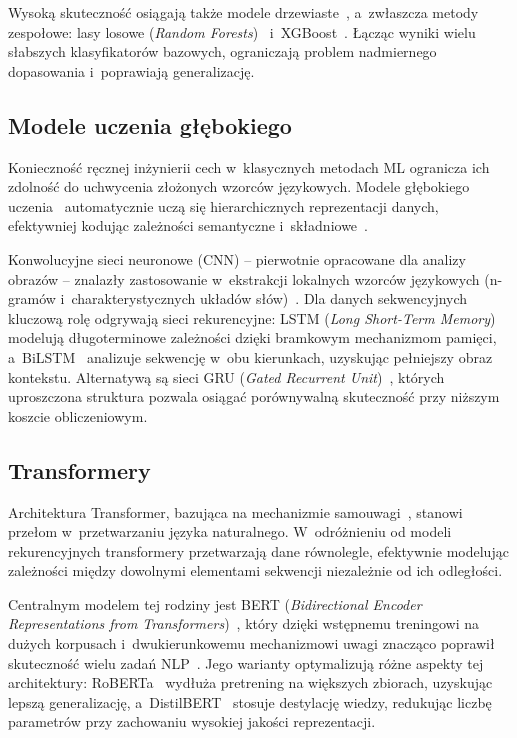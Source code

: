 \documentclass[oneside,polski,logo]{amuthesis}
\begin{document}
Wysoką skuteczność osiągają także modele drzewiaste~\cite{barry2013decision}, a~zwłaszcza metody zespołowe: lasy losowe (\textit{Random Forests})~\cite{Breiman2001} i~XGBoost~\cite{Chen2016XGBoost}. Łącząc wyniki wielu słabszych klasyfikatorów bazowych, ograniczają problem nadmiernego dopasowania i~poprawiają generalizację.

\subsection{Modele uczenia głębokiego}

Konieczność ręcznej inżynierii cech w~klasycznych metodach ML ogranicza ich zdolność do uchwycenia złożonych wzorców językowych. Modele głębokiego uczenia~\cite{Alzubaidi2021} automatycznie uczą się hierarchicznych reprezentacji danych, efektywniej kodując zależności semantyczne i~składniowe~\cite{AlTarawneh2024}.

Konwolucyjne sieci neuronowe (CNN) -- pierwotnie opracowane dla analizy obrazów -- znalazły zastosowanie w~ekstrakcji lokalnych wzorców językowych (n-gramów i~charakterystycznych układów słów)~\cite{Roumeliotis2025}. Dla danych sekwencyjnych kluczową rolę odgrywają sieci rekurencyjne: LSTM (\textit{Long Short-Term Memory})~\cite{7508408} modelują długoterminowe zależności dzięki bramkowym mechanizmom pamięci, a~BiLSTM~\cite{9005997} analizuje sekwencję w~obu kierunkach, uzyskując pełniejszy obraz kontekstu. Alternatywą są sieci GRU (\textit{Gated Recurrent Unit})~\cite{8053243}, których uproszczona struktura pozwala osiągać porównywalną skuteczność przy niższym koszcie obliczeniowym.

\subsection{Transformery}

Architektura Transformer, bazująca na mechanizmie samouwagi~\cite{Teo2024}, stanowi przełom w~przetwarzaniu języka naturalnego. W~odróżnieniu od modeli rekurencyjnych transformery przetwarzają dane równolegle, efektywnie modelując zależności między dowolnymi elementami sekwencji niezależnie od ich odległości.

Centralnym modelem tej rodziny jest BERT (\textit{Bidirectional Encoder Representations from Transformers})~\cite{Devlin2019BERTPO}, który dzięki wstępnemu treningowi na dużych korpusach i~dwukierunkowemu mechanizmowi uwagi znacząco poprawił skuteczność wielu zadań NLP~\cite{Aljawarneh2024}. Jego warianty optymalizują różne aspekty tej architektury: RoBERTa~\cite{Liu2019RoBERTa} wydłuża pretrening na większych zbiorach, uzyskując lepszą generalizację, a~DistilBERT~\cite{sanh2020distilbert} stosuje destylację wiedzy, redukując liczbę parametrów przy zachowaniu wysokiej jakości reprezentacji.
\end{document}
